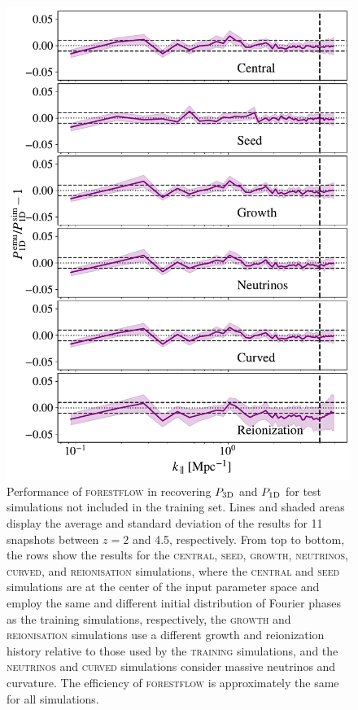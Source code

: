 \documentclass[longauth]{aa}
\newcommand{\poned}{\ensuremath{P_{\rm 1D}}\xspace}
\newcommand{\pthreed}{\ensuremath{P_{\rm 3D}}\xspace}
\newcommand{\forestflow}{\textsc{forestflow}\xspace}
\newcommand{\lacehc}{\textsc{training}\xspace}
\newcommand{\simseed}{\textsc{seed}\xspace}
\newcommand{\simigm}{\textsc{reionisation}\xspace}
\newcommand{\simcurved}{\textsc{curved}\xspace}
\newcommand{\simh}{\textsc{growth}\xspace}
\newcommand{\simnu}{\textsc{neutrinos}\xspace}
\newcommand{\simcentral}{\textsc{central}\xspace}
\begin{document}
\begin{figure}
\includegraphics[width= 0.96\columnwidth]{figures/test_cosmo_P1D.pdf}
\centering
\caption{Performance of \forestflow in recovering \pthreed and \poned for test simulations not included in the training set. Lines and shaded areas display the average and standard deviation of the results for 11 snapshots between $z=2$ and 4.5, respectively. From top to bottom, the rows show the results for the \simcentral, \simseed, \simh, \simnu, \simcurved, and \simigm simulations, where the \simcentral and \simseed simulations are at the center of the input parameter space and employ the same and different initial distribution of Fourier phases as the training simulations, respectively, the \simh and \simigm simulations use a different growth and reionization history relative to those used by the \lacehc simulations, and the \simnu and \simcurved simulations consider massive neutrinos and curvature. The efficiency of \forestflow is approximately the same for all simulations.}
\label{fig:other_cosmo}
\end{figure}
\end{document}
